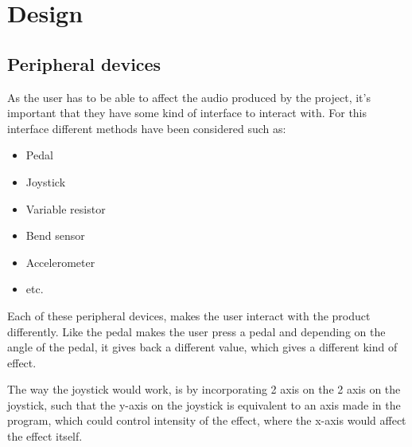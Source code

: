 \chapter{Design}\label{ch:design}

\section{Peripheral devices}
As the user has to be able to affect the audio produced by the project, it's important that they have some kind of interface to interact with. For this interface different methods have been considered such as:

\begin{itemize}
\item Pedal
\item Joystick
\item Variable resistor
\item Bend sensor
\item Accelerometer
\item etc.
\end{itemize}

Each of these peripheral devices, makes the user interact with the product differently. Like the pedal makes the user press a pedal and depending on the angle of the pedal, it gives back a different value, which gives a different kind of effect.

The way the joystick would work, is by incorporating 2 axis on the 2 axis on the joystick, such that the y-axis on the joystick is equivalent to an axis made in the program, which could control intensity of the effect, where the x-axis would affect the effect itself. 